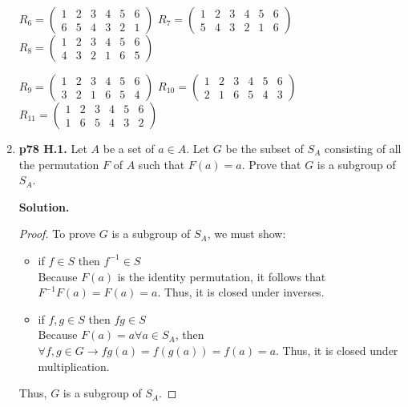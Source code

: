 \documentclass[11pt]{article}
\begin{document}
\begin{enumerate}
	$R_6 = \begin{pmatrix}
		1 & 2 & 3 & 4 & 5 & 6 \\
		6 & 5 & 4 & 3 & 2 & 1
	\end{pmatrix}$
	$R_7 = \begin{pmatrix}
		1 & 2 & 3 & 4 & 5 & 6 \\
		5 & 4 & 3 & 2 & 1 & 6
	\end{pmatrix}$
	$R_8 = \begin{pmatrix}
		1 & 2 & 3 & 4 & 5 & 6 \\
		4 & 3 & 2 & 1 & 6 & 5
	\end{pmatrix}$
	
	$R_9 = \begin{pmatrix}
		1 & 2 & 3 & 4 & 5 & 6 \\
		3 & 2 & 1 & 6 & 5 & 4
	\end{pmatrix}$
	$R_{10} = \begin{pmatrix}
		1 & 2 & 3 & 4 & 5 & 6 \\
		2 & 1 & 6 & 5 & 4 & 3
	\end{pmatrix}$
	$R_{11} = \begin{pmatrix}
		1 & 2 & 3 & 4 & 5 & 6 \\
		1 & 6 & 5 & 4 & 3 & 2
	\end{pmatrix}$

\item {\bfseries p78 H.1.} Let $A$ be a set of $a \in A$. Let $G$ be the subset of $S_A$ consisting of all the permutation $F$ of $A$ such that $F(a) = a$. Prove that $G$ is a subgroup of $S_A$.
  
	{\bfseries Solution.}
	
	\begin{proof}
	To prove $G$ is a subgroup of $S_A$, we must show:
	
	\begin{itemize}
	\item if $f \in S$ then $f^{-1} \in S$ \\
	Because $F(a)$ is the identity permutation, it follows that $F^{-1}F(a) = F(a) = a$. Thus, it is closed under inverses.
	
	\item if $f,g \in S$ then $fg \in S$ \\
	Because $F(a) = a \forall a \in S_A$, then $\forall f,g \in G \rightarrow fg(a) = f(g(a)) = f(a) = a$. Thus, it is closed under multiplication.
	\end{itemize}
	
	Thus, $G$ is a subgroup of $S_A$.
	

\end{proof}
\end{enumerate}
\end{document}
